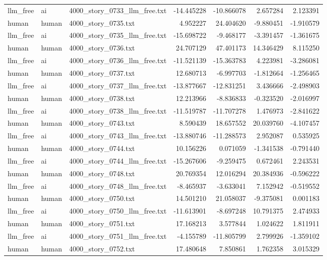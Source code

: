 \begin{longtable}{lllrrrr}
llm\_free & ai & 4000\_story\_0733\_llm\_free.txt & -14.445228 & -10.866078 & 2.657284 & 2.123391 \\
human & human & 4000\_story\_0735.txt & 4.952227 & 24.404620 & -9.880451 & -1.910579 \\
llm\_free & ai & 4000\_story\_0735\_llm\_free.txt & -15.698722 & -9.468177 & -3.391457 & -1.361675 \\
human & human & 4000\_story\_0736.txt & 24.707129 & 47.401173 & 14.346429 & 8.115250 \\
llm\_free & ai & 4000\_story\_0736\_llm\_free.txt & -11.521139 & -15.363783 & 4.223981 & -3.286081 \\
human & human & 4000\_story\_0737.txt & 12.680713 & -6.997703 & -1.812664 & -1.256465 \\
llm\_free & ai & 4000\_story\_0737\_llm\_free.txt & -13.877667 & -12.831251 & 3.436666 & -2.498903 \\
human & human & 4000\_story\_0738.txt & 12.213966 & -8.836833 & -0.323520 & -2.016997 \\
llm\_free & ai & 4000\_story\_0738\_llm\_free.txt & -11.519787 & -11.707278 & 1.476973 & -2.841622 \\
human & human & 4000\_story\_0743.txt & 8.590439 & 18.657552 & 20.039760 & -4.107457 \\
llm\_free & ai & 4000\_story\_0743\_llm\_free.txt & -13.880746 & -11.288573 & 2.952087 & 0.535925 \\
human & human & 4000\_story\_0744.txt & 10.156226 & 0.071059 & -1.341538 & -0.791440 \\
llm\_free & ai & 4000\_story\_0744\_llm\_free.txt & -15.267606 & -9.259475 & 0.672461 & 2.243531 \\
human & human & 4000\_story\_0748.txt & 20.769354 & 12.016294 & 20.384936 & -0.596222 \\
llm\_free & ai & 4000\_story\_0748\_llm\_free.txt & -8.465937 & -3.633041 & 7.152942 & -0.519552 \\
human & human & 4000\_story\_0750.txt & 14.501210 & 21.058037 & -9.375081 & 0.001183 \\
llm\_free & ai & 4000\_story\_0750\_llm\_free.txt & -11.613901 & -8.697248 & 10.791375 & 2.474933 \\
human & human & 4000\_story\_0751.txt & 17.168213 & 3.577844 & 1.024622 & 1.811911 \\
llm\_free & ai & 4000\_story\_0751\_llm\_free.txt & -4.155789 & -11.805799 & 2.799926 & -1.359102 \\
human & human & 4000\_story\_0752.txt & 17.480648 & 7.850861 & 1.762358 & 3.015329 \\

\end{longtable}
